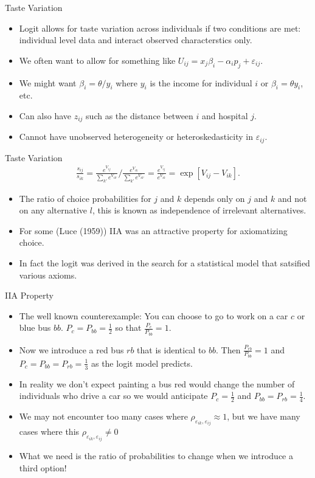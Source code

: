 \documentclass[xcolor=pdftex,dvipsnames,table,mathserif]{beamer}
\begin{document}
\begin{frame}{Taste Variation}
\begin{itemize}
\item Logit allows for taste variation across individuals if two conditions are met: \alert{individual level data} and \alert{interact observed characterstics} only.
\item We often want to allow for something like $U_{ij} = x_{j} \beta_i - \alpha_i p_j + \varepsilon_{ij}$. 
\item We might want $\beta_i = \theta / y_i$ where $y_i$ is the income for individual $i$ or $\beta_i = \theta y_i$, etc.
\item Can also have $z_{ij}$ such as the distance between $i$ and hospital $j$.
\item Cannot have unobserved heterogeneity or heteroskedasticity in $\varepsilon_{ij}$.
\end{itemize}
\end{frame}

\begin{frame}{Taste Variation}
\begin{eqnarray*}
\frac{s_{ij}}{s_{ik}} = \frac{e^{V_{ij}}}{\sum_{k'} e^{V_{ik'}}} / \frac{e^{V_{ik}}}{\sum_{k'} e^{V_{ik'}}} = \frac{e^{V_{ij}}}{e^{V_{ik}}} = \exp[V_{ij} - V_{ik}].
\end{eqnarray*}
\begin{itemize}
\item The ratio of choice probabilities for $j$ and $k$ depends only on $j$ and $k$ and not on any alternative $l$, this is known as \alert{independence of irrelevant alternatives}.
\item For some (Luce (1959)) IIA was an attractive property for axiomatizing choice.
\item In fact the logit was derived in the search for a statistical model that satsified various axioms.
\end{itemize}
\end{frame}

\begin{frame}{IIA Property}
\begin{itemize}
\item The well known counterexample: You can choose to go to work on a car $c$ or blue bus $bb$. $P_{c} = P_{bb} = \frac{1}{2}$ so that $\frac{P_c}{P_{bb}} = 1$.
\item Now we introduce a red bus $rb$ that is identical to $bb$. Then $\frac{P_{rb}}{P_{bb}} = 1$ and $P_{c} = P_{bb}= P_{rb} = \frac{1}{3}$ as the logit model predicts.
\item In reality we don't expect painting a bus red would change the number of individuals who drive a car so we would anticipate $P_{c} = \frac{1}{2}$ and $P_{bb} = P_{rb} = \frac{1}{4}$.
\item We may not encounter too many cases where $\rho_{\varepsilon_{ik},\varepsilon_{ij}} \approx 1$, but we have many cases where this $\rho_{\varepsilon_{ik},\varepsilon_{ij}} \neq 0$
\item What we need is the ratio of probabilities to change when we introduce a third option!
\end{itemize}
\end{frame}
\end{document}
